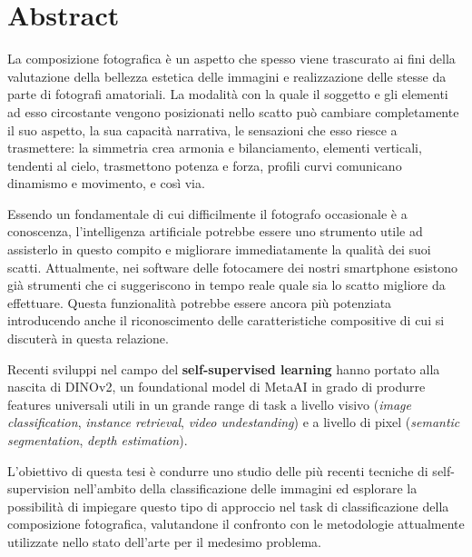 \thispagestyle{plain}
\chapter*{Abstract}
La composizione fotografica è un aspetto che spesso viene trascurato ai fini della valutazione della bellezza estetica delle immagini e realizzazione delle stesse da parte di fotografi amatoriali. La modalità con la quale il soggetto e gli elementi ad esso circostante vengono posizionati nello scatto può cambiare completamente il suo aspetto, la sua capacità narrativa, le sensazioni che esso riesce a trasmettere: la simmetria crea armonia e bilanciamento, elementi verticali, tendenti al cielo, trasmettono potenza e forza, profili curvi comunicano dinamismo e movimento, e così via.

Essendo un fondamentale di cui difficilmente il fotografo occasionale è a conoscenza, l'intelligenza artificiale potrebbe essere uno strumento utile ad assisterlo in questo compito e migliorare immediatamente la qualità dei suoi scatti. Attualmente, nei software delle fotocamere dei nostri smartphone esistono già strumenti che ci suggeriscono in tempo reale quale sia lo scatto migliore da effettuare. Questa funzionalità potrebbe essere ancora più potenziata introducendo anche il riconoscimento delle caratteristiche compositive di cui si discuterà in questa relazione.
 
Recenti sviluppi nel campo del \textbf{self-supervised learning} hanno portato alla nascita di DINOv2, un foundational model di MetaAI in grado di produrre features universali utili in un grande range di task a livello visivo (\textit{image classification}, \textit{instance retrieval}, \textit{video undestanding}) e a livello di pixel (\textit{semantic segmentation}, \textit{depth estimation}). 

L'obiettivo di questa tesi è condurre uno studio delle più recenti tecniche di self-supervision nell'ambito della classificazione delle immagini ed esplorare la possibilità di impiegare questo tipo di approccio nel task di classificazione della composizione fotografica, valutandone il confronto con le metodologie attualmente utilizzate nello stato dell'arte per il medesimo problema.